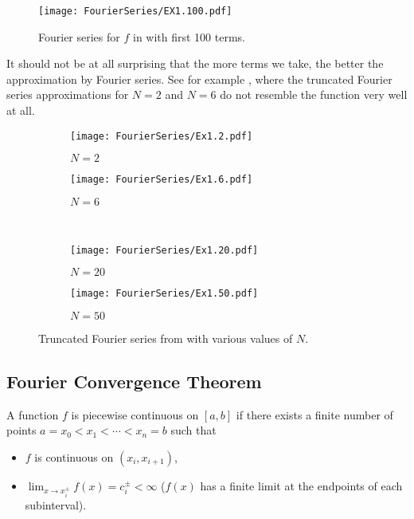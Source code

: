 \begin{figure}[!ht]
	\centering
	\texttt{[image: FourierSeries/EX1.100.pdf]}
	\caption{Fourier series for $f$ in  with first 100 terms.}
	\label{fig:fouriereg100}
\end{figure}

It should not be at all surprising that the more terms we take, the better the approximation by Fourier series. See for example , where the truncated Fourier series approximations for $N=2$ and $N=6$ do not resemble the function very well at all.

\begin{figure}[!ht]
	\centering
	\begin{subfigure}[b]{0.49\textwidth}
		\centering
		\texttt{[image: FourierSeries/Ex1.2.pdf]}
		\caption{$N=2$}
	\end{subfigure}
	\hfill
	\begin{subfigure}[b]{0.49\textwidth}
		\centering
		\texttt{[image: FourierSeries/Ex1.6.pdf]}
		\caption{$N=6$}
	\end{subfigure}
	\\
	\begin{subfigure}[b]{0.49\textwidth}
		\centering
		\texttt{[image: FourierSeries/Ex1.20.pdf]}
		\caption{$N=20$}
	\end{subfigure}
	\hfill
	\begin{subfigure}[b]{0.49\textwidth}
		\centering
		\texttt{[image: FourierSeries/Ex1.50.pdf]}
		\caption{$N=50$}
	\end{subfigure}
	\caption{Truncated Fourier series from  with various values of $N$.}
	\label{fig:fourieregsub}
\end{figure}

\subsection{Fourier Convergence Theorem}

\begin{definition}
	A function $f$ is piecewise continuous on $[a,b]$ if there exists a finite number of points $a = x_0 < x_1 < \cdots < x_n = b$ such that
	\begin{itemize}
		\item $f$ is continuous on $(x_i, x_{i+1})$,
		\item $\lim_{x \to x_i^{\pm}} f(x) = c_i^{\pm} < \infty$ ($f(x)$ has a finite limit at the endpoints of each subinterval).
	\end{itemize}
\end{definition}

